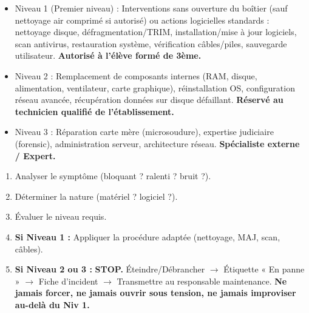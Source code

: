 \documentclass[11pt]{article}
\newcommand{\cle}[1]{{\popxbold\color{popdark}#1}}
\begin{document}
\begin{definition}
    \begin{itemize}
        \item \cle{Niveau 1 (Premier niveau) :} Interventions sans ouverture du boîtier (sauf nettoyage air comprimé si autorisé) ou actions logicielles standards : nettoyage disque, défragmentation/TRIM, installation/mise à jour logiciels, scan antivirus, restauration système, vérification câbles/piles, sauvegarde utilisateur. \textbf{Autorisé à l'élève formé de 3ème.}
        \item \cle{Niveau 2 :} Remplacement de composants internes (RAM, disque, alimentation, ventilateur, carte graphique), réinstallation OS, configuration réseau avancée, récupération données sur disque défaillant. \textbf{Réservé au technicien qualifié de l'établissement.}
        \item \cle{Niveau 3 :} Réparation carte mère (microsoudure), expertise judiciaire (forensic), administration serveur, architecture réseau. \textbf{Spécialiste externe / Expert.}
    \end{itemize}
\end{definition}

\begin{aretenir}
    \begin{enumerate}
        \item Analyser le symptôme (bloquant ? ralenti ? bruit ?).
        \item Déterminer la nature (matériel ? logiciel ?).
        \item Évaluer le niveau requis.
        \item \textbf{Si Niveau 1 :} Appliquer la procédure adaptée (nettoyage, MAJ, scan, câbles).
        \item \textbf{Si Niveau 2 ou 3 :} \textbf{STOP.} Éteindre/Débrancher $\rightarrow$ Étiquette « En panne » $\rightarrow$ Fiche d'incident $\rightarrow$ Transmettre au responsable maintenance. \textbf{Ne jamais forcer, ne jamais ouvrir sous tension, ne jamais improviser au-delà du Niv 1.}
    \end{enumerate}
\end{aretenir}
\end{document}
